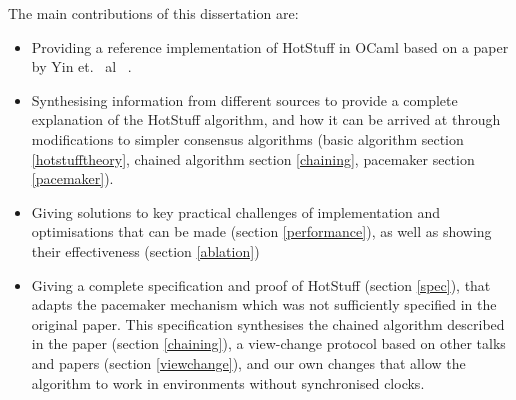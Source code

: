 The main contributions of this dissertation are:
\begin{itemize}
	\item Providing a reference implementation of HotStuff in OCaml based on a paper by Yin et. ~al~ \cite{yin2019hotstuff}.
	\item Synthesising information from different sources to provide a complete explanation of the HotStuff algorithm, and how it can be arrived at through modifications to simpler consensus algorithms (basic algorithm section \ref{hotstufftheory}, chained algorithm section \ref{chaining}, pacemaker section \ref{pacemaker}).
	\item Giving solutions to key practical challenges of implementation and optimisations that can be made (section \ref{performance}), as well as showing their effectiveness (section \ref{ablation})
	\item Giving a complete specification and proof of HotStuff (section \ref{spec}), that adapts the pacemaker mechanism which was not sufficiently specified in the original paper. This specification synthesises the chained algorithm described in the paper (section \ref{chaining}), a view-change protocol based on other talks and papers (section \ref{viewchange}), and our own changes that allow the algorithm to work in environments without synchronised clocks.
\end{itemize}

